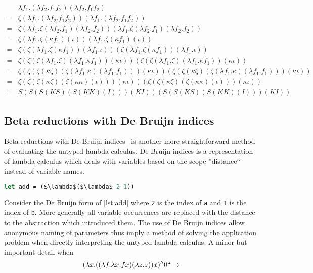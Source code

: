 \documentclass[11pt,oneside,a4paper]{report}
\begin{document}
\begin{align}
    &\lambda f_1 . (\lambda f_2 . f_1 f_2) (\lambda f_2 . f_1 f_2)\\
    =&\zeta(\lambda f_1 . (\lambda f_2 . f_1 f_2))(\lambda f_1 . (\lambda f_2 . f_1 f_2))\tag*{}\\
    =&\zeta(\lambda f_1 . \zeta(\lambda f_2 . f_1)(\lambda f_2 . f_2))(\lambda f_1 . \zeta(\lambda f_2 . f_1)(\lambda f_2 . f_2))\tag*{}\\
    =&\zeta(\lambda f_1 . \zeta(\kappa f_1)(\iota))(\lambda f_1 . \zeta(\kappa f_1)(\iota))\tag*{}\\
    =&\zeta(\zeta(\lambda f_1 . \zeta (\kappa f_1))(\lambda f_1 . \iota))(\zeta(\lambda f_1 . \zeta (\kappa f_1))(\lambda f_1 . \iota))\tag*{}\\
    =&\zeta(\zeta(\zeta(\lambda f_1 . \zeta)(\lambda f_1 . \kappa f_1))(\kappa\iota))(\zeta(\zeta(\lambda f_1 . \zeta)(\lambda f_1 . \kappa f_1))(\kappa\iota))\tag*{}\\
    =&\zeta(\zeta(\zeta(\kappa \zeta)(\zeta (\lambda f_1 . \kappa) (\lambda f_1 . f_1)))(\kappa\iota))(\zeta(\zeta(\kappa \zeta)(\zeta (\lambda f_1 . \kappa) (\lambda f_1 . f_1)))(\kappa\iota))\tag*{}\\
    =&\zeta(\zeta(\zeta(\kappa \zeta)(\zeta (\kappa \kappa) (\iota)))(\kappa\iota))(\zeta(\zeta(\kappa \zeta)(\zeta (\kappa \kappa) (\iota)))(\kappa\iota))\tag*{}\\
    =&S(S(S(K S)(S (K K) (I)))(KI))(S(S(K S)(S (K K) (I)))(KI))\tag*{}
\end{align}

\subsection{Beta reductions with De Bruijn indices}
Beta reductions with De Bruijn indices~\cite{de1972lambda} is another more straightforward method of evaluating the untyped lambda calculus.
De Bruijn indices is a representation of lambda calculus which deals with variables based on the scope ''distance`` instead of variable names.
\begin{lstlisting}[language=ML,caption={Add as De Bruijn},label={lst:adddebru},mathescape=true]
let add = ($\lambda$($\lambda$ 2 1))
\end{lstlisting}
Consider the De Bruijn form of \autoref{lst:add} where \texttt{2} is the index of \texttt{a} and \texttt{1} is the index of \texttt{b}.
More generally all variable occurrences are replaced with the distance to the abstraction which introduced them.
The use of De Bruijn indices allow anonymous naming of parameters thus imply a method of solving the application problem when directly interpreting the untyped lambda calculus.
A minor but important detail when 
\begin{align}
    &(\lambda x . ((\lambda f. \lambda x. f x)(\lambda z . z))x)''0`` \rightarrow\\
    &
\end{align}
\end{document}
